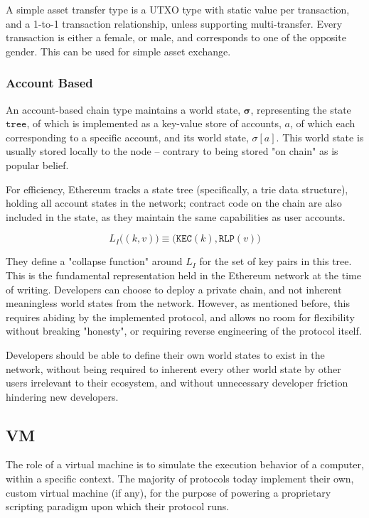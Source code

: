 \documentclass[12pt, titlepage, twocolumn]{report}
\begin{document}
A simple asset transfer type is a UTXO type with static value per transaction, and a 1-to-1 transaction relationship, unless supporting multi-transfer. Every transaction is either a female, or male, and corresponds to one of the opposite gender. This can be used for simple asset exchange.

\subsubsection{Account Based}
An account-based chain type maintains a world state, \( \boldsymbol{\sigma} \), representing the state \(\texttt{tree}\), of which is implemented as a key-value store of accounts, \(a\), of which each corresponding to a specific account, and its world state, \( \sigma [a] \). This world state is usually stored locally to the node -- contrary to being stored "on chain" as is popular belief.

For efficiency, Ethereum tracks a state tree (specifically, a trie data structure), holding all account states in the network; contract code on the chain are also included in the state, as they maintain the same capabilities as user accounts. 

\begin{equation}
L_{I}\big( (k, v) \big) \equiv \big(\texttt{KEC}(k), \texttt{RLP}(v)\big)
\end{equation}

They define a "collapse function" around \(L_{I}\) for the set of key pairs in this tree. This is the fundamental representation held in the Ethereum network at the time of writing.
Developers can choose to deploy a private chain, and not inherent meaningless world states from the network. However, as mentioned before, this requires abiding by the implemented protocol, and allows no room for flexibility without breaking "honesty", or requiring reverse engineering of the protocol itself.

Developers should be able to define their own world states to exist in the network, without being required to inherent every other world state by other users irrelevant to their ecosystem, and without unnecessary developer friction hindering new developers.


\subsection{VM}

The role of a virtual machine is to simulate the execution behavior of a computer, within a specific context. The majority of protocols today implement their own, custom virtual machine (if any), for the purpose of powering a proprietary scripting paradigm upon which their protocol runs. 
\end{document}
